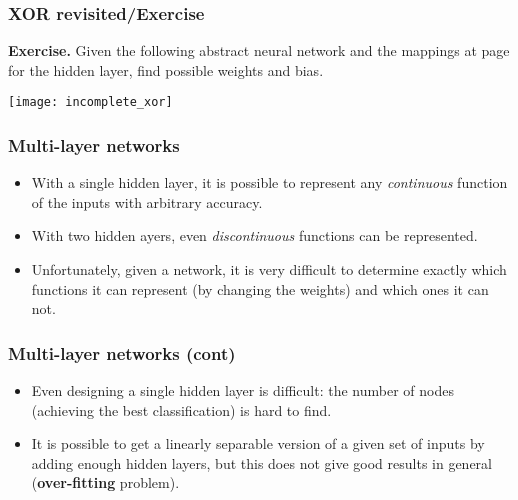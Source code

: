 %
\begin{frame}
\frametitle{XOR revisited/Exercise}

\textbf{Exercise.} Given the following abstract neural network and the
mappings at page \pageref{xor} for the hidden layer, find possible
weights and bias.
\begin{center}
\texttt{[image: incomplete\_xor]}
\end{center}

\end{frame}

%
\begin{frame}
\frametitle{Multi-layer networks}

\begin{itemize}

  \item With a single hidden layer, it is possible to represent any
  \emph{continuous} function of the inputs with arbitrary accuracy.

  \item With two hidden ayers, even \emph{discontinuous} functions
  can be represented.

  \item Unfortunately, given a network, it is very difficult to
  determine exactly which functions it can represent (by changing the
  weights) and which ones it can not.

\end{itemize}

\end{frame}


%
\begin{frame}
\frametitle{Multi-layer networks (cont)}

\begin{itemize}

  \item Even designing a single hidden layer is difficult: the number
  of nodes (achieving the best classification) is hard to find.

  \item It is possible to get a linearly separable version of a given
  set of inputs by adding enough hidden layers, but this does not give
  good results in general (\textbf{over-fitting} problem).

\end{itemize}

\end{frame}

